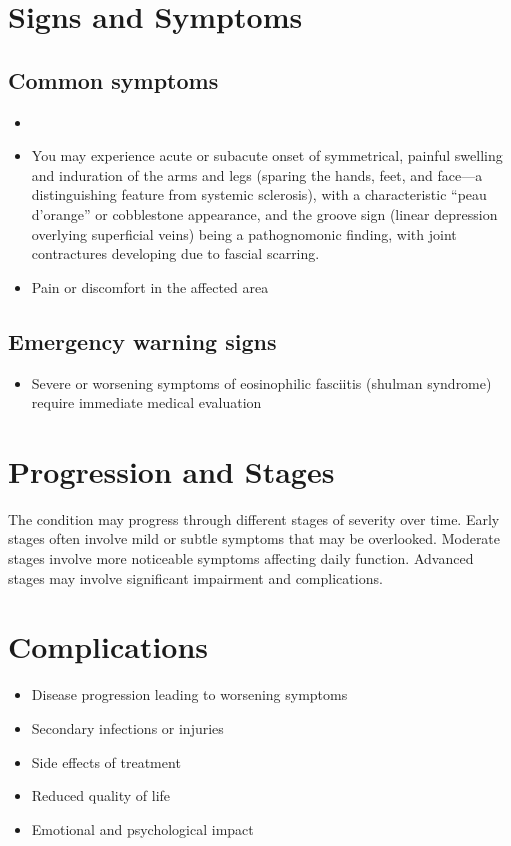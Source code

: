 \section{Signs and Symptoms}

\subsection{Common symptoms}
\begin{itemize}[noitemsep]
  \item \item You may experience acute or subacute onset of symmetrical, painful swelling and induration of the arms and legs (sparing the hands, feet, and face---a distinguishing feature from systemic sclerosis), with a characteristic ``peau d'orange'' or cobblestone appearance, and the groove sign (linear depression overlying superficial veins) being a pathognomonic finding, with joint contractures developing due to fascial scarring.

  \item Pain or discomfort in the affected area
  \end{itemize}

\subsection{Emergency warning signs}
\begin{itemize}[noitemsep]
  \item Severe or worsening symptoms of eosinophilic fasciitis (shulman syndrome) require immediate medical evaluation
\end{itemize}
\section{Progression and Stages}
The condition may progress through different stages of severity over time. Early stages often involve mild or subtle symptoms that may be overlooked. Moderate stages involve more noticeable symptoms affecting daily function. Advanced stages may involve significant impairment and complications.
\section{Complications}
\begin{itemize}[noitemsep]
  \item Disease progression leading to worsening symptoms
  \item Secondary infections or injuries
  \item Side effects of treatment
  \item Reduced quality of life
  \item Emotional and psychological impact
\end{itemize}
